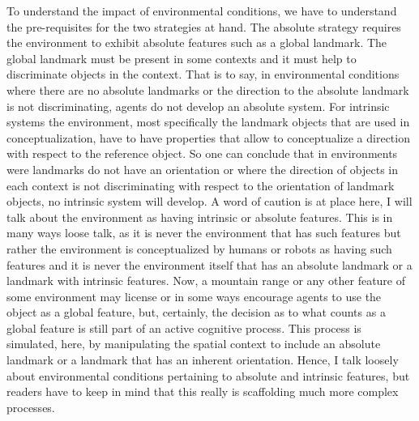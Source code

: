 To understand the impact of environmental conditions, we have to understand the pre-requisites
for the two strategies at hand. The absolute strategy requires the environment
to exhibit absolute features such as a global landmark. The global landmark must be present
in some contexts and it must help to discriminate objects in the context. That is to say,
in environmental conditions where there are no absolute landmarks or the direction
to the absolute landmark is not discriminating, agents do not develop an absolute system.
For intrinsic systems the environment, most specifically the landmark objects that are used
in conceptualization, have to have properties that allow to conceptualize a direction with respect
to the reference object. So one can conclude that in environments were landmarks do not have an 
orientation or where the direction of objects in each context is not discriminating with respect to the
orientation of landmark objects, no intrinsic system will develop. A word of caution is at place here,
I will talk about the environment as having intrinsic or absolute features. This is in many ways
loose talk, as it is never the environment that has such features but rather the environment is 
conceptualized by humans or robots as having such features and it is never the environment itself
that has an absolute landmark or a landmark with intrinsic features. Now, a mountain range or any
other feature of some environment may license or in some ways encourage agents to use the object
as a global feature, but, certainly, the decision as to what counts as a global feature is still part of an active
cognitive process. This process is simulated, here, by manipulating the spatial context to include
an absolute landmark or a landmark that has an inherent orientation. Hence, I talk loosely
about environmental conditions pertaining to absolute and intrinsic features, but readers have
to keep in mind that this really is scaffolding much more complex processes.

